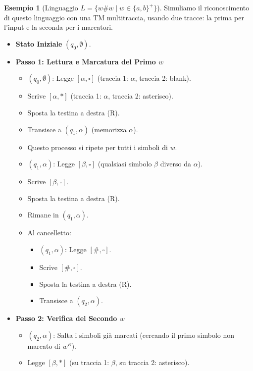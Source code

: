 \documentclass[a4paper]{article}
\theoremstyle{definition} %
\newtheorem{example}{Esempio}
\newcommand{\blankS}{\ensuremath{\square}}
\begin{document}
\begin{example}[Linguaggio $L = \{w\#w \mid w \in \{a,b\}^+\}$]
Simuliamo il riconoscimento di questo linguaggio con una TM multitraccia, usando due tracce: la prima per l'input e la seconda per i marcatori.
\begin{itemize}
    \item \textbf{Stato Iniziale} $(q_0, \emptyset)$.
    \item \textbf{Passo 1: Lettura e Marcatura del Primo $w$}
        \begin{itemize}
            \item $(q_0, \emptyset)$: Legge $[\alpha, \blankS]$ (traccia 1: $\alpha$, traccia 2: blank).
            \item Scrive $[\alpha, *]$ (traccia 1: $\alpha$, traccia 2: asterisco).
            \item Sposta la testina a destra (R).
            \item Transisce a $(q_1, \alpha)$ (memorizza $\alpha$).
            \item Questo processo si ripete per tutti i simboli di $w$.
            \item $(q_1, \alpha)$: Legge $[\beta, \blankS]$ (qualsiasi simbolo $\beta$ diverso da $\alpha$).
            \item Scrive $[\beta, \blankS]$.
            \item Sposta la testina a destra (R).
            \item Rimane in $(q_1, \alpha)$.
            \item Al cancelletto:
                \begin{itemize}
                    \item $(q_1, \alpha)$: Legge $[\#, \blankS]$.
                    \item Scrive $[\#, \blankS]$.
                    \item Sposta la testina a destra (R).
                    \item Transisce a $(q_2, \alpha)$.
                \end{itemize}
        \end{itemize}
    \item \textbf{Passo 2: Verifica del Secondo $w$}
        \begin{itemize}
            \item $(q_2, \alpha)$: Salta i simboli già marcati (cercando il primo simbolo non marcato di $w^R$).
            \item Legge $[\beta, *]$ (su traccia 1: $\beta$, su traccia 2: asterisco).

\end{itemize}
\end{itemize}
\end{example}
\end{document}
